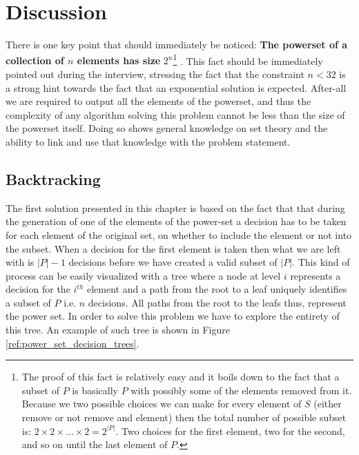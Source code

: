 \section{Discussion}
\label{sec:powerset:discussion}
There is one key point that should immediately be noticed: \textbf{The powerset of a collection of
	$n$ elements has size} $\boxed{2^n}$\footnote{The proof of this fact is relatively easy and it boils
	down to the fact that a subset of $P$ is basically $P$ with possibly some of the elements
	removed from it. Because we two possible choices we can make for every element of $S$ (either
	remove or not remove and element) then the total number of possible subset is: $2 \times 2
	\times \ldots \times 2 = 2^{|P|}$. Two choices for the first element, two for the second, and so
	on until the last element of $P$.} . This fact should be immediately pointed out during the
	interview, stressing the fact that the constraint $n < 32$ is a strong hint towards the fact
	that an exponential solution is expected. After-all we are required to output all the elements
	of the powerset, and thus the complexity of any algorithm solving this problem cannot be less
	than the size of the powerset itself. Doing so shows general knowledge on set theory and the
	ability to link and use that knowledge with the problem statement.


\subsection{Backtracking}
The first solution presented in this chapter is based on the fact that that during the generation of
one of the elements of the power-set a decision has to be taken for each element of the original
set, on whether to include the element or not into the subset. When a decision for the first element
is taken then what we are left with is $|P|-1$ decisions before we have created a valid subset of
$|P|$. 
This kind of process can be easily visualized with a tree where a node at level $i$
represents a decision for the $i^{th}$ element and a path from the root to a leaf uniquely
identifies a subset of $P$ i.e. $n$ decisions. 
All paths from the root to the leafs thus, represent the power set. In
order to solve this problem we have to explore the entirety of this tree. An example of such tree is
shown in Figure \ref{ref:power_set_decision_trees}.


